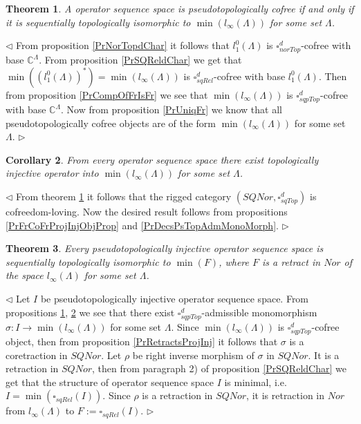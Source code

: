 \documentclass[12pt]{article}
\newtheorem{theorem}{Theorem}[subsection]
\newtheorem{corollary}[theorem]{Corollary}
\newenvironment{proof}{\par $\triangleleft$}{$\triangleright$}
\begin{document}
\begin{theorem}\label{ThPsTopCoFrDesc} 
A operator sequence space is pseudotopologically cofree if and only if it is sequentially topologically isomorphic to $\min(l_\infty(\Lambda))$ for some set $\Lambda$.
\end{theorem}
\begin{proof}
From proposition \ref{PrNorTopdChar} it follows that $l_1^0(\Lambda)$ is $\square_{norTop}^d$-cofree with base $\mathbb{C}^\Lambda$. From proposition \ref{PrSQReldChar} we get that $\min((l_1^0(\Lambda))^*)=\min(l_\infty(\Lambda))$ is  $\square_{sqRel}^d$-cofree with base 
$l_1^0(\Lambda)$. Then from proposition \ref{PrCompOfFrIsFr} we see that  $\min(l_\infty(\Lambda))$ is $\square_{sqpTop}^d$-cofree with base $\mathbb{C}^\Lambda$. Now from proposition \ref{PrUniqFr} we know that all pseudotopologically cofree objects are of the form $\min(l_\infty(\Lambda))$ for some set $\Lambda$.
\end{proof}

\begin{corollary}\label{CorSQSpaceIsFromPsTopAdmMonoMorph}
From every operator sequence space there exist topologically injective operator into $\min(l_\infty(\Lambda))$ for some set $\Lambda$.
\end{corollary}
\begin{proof}
From theorem \ref{ThPsTopCoFrDesc} it follows that the rigged category $(SQNor,\square_{sqTop}^d)$ is cofreedom-loving. Now the desired result  follows from propositions \ref{PrFrCoFrProjInjObjProp} and \ref{PrDecsPsTopAdmMonoMorph}.
\end{proof}

\begin{theorem}\label{ThPsTopInjDesc} 
Every pseudotopologically injective operator sequence space is sequentially topologically isomorphic to $\min(F)$, where $F$ is a retract in $Nor$ of the space $l_\infty(\Lambda)$ for some set $\Lambda$.
\end{theorem}
\begin{proof}
Let $I$ be pseudotopologically injective operator sequence space. 
From propositions \ref{ThPsTopCoFrDesc}, \ref{CorSQSpaceIsFromPsTopAdmMonoMorph} we see that there exist $\square_{sqpTop}^d$-admissible monomorphism $\sigma:I\to\min(l_\infty(\Lambda))$ for some set $\Lambda$. Since $\min(l_\infty(\Lambda))$ is $\square_{sqpTop}^d$-cofree object, then from proposition \ref{PrRetractsProjInj} it follows that $\sigma$ is a coretraction in $SQNor$. Let $\rho$ be right inverse morphism of $\sigma$ in $SQNor$. It is a retraction in $SQNor$, then from paragraph 2) of proposition \ref{PrSQReldChar} we get that the structure of operator sequence space $I$ is minimal, i.e. $I=\min(\square_{sqRel}(I))$. Since $\rho$ is a retraction in $SQNor$, it is retraction in $Nor$ from $l_\infty(\Lambda)$ to $F:=\square_{sqRel}(I)$.
\end{proof}
\end{document}
